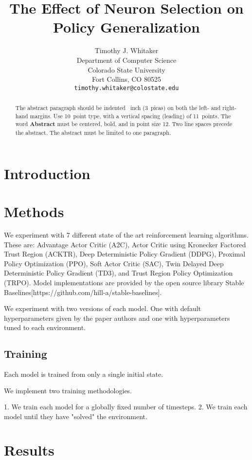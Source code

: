 \documentclass{article}
\title{The Effect of Neuron Selection on Policy Generalization}
\author{%
  Timothy J. Whitaker\\
  Department of Computer Science\\
  Colorado State University\\
  Fort Collins, CO 80525 \\
  \texttt{timothy.whitaker@colostate.edu} \\
}
\begin{document}
\maketitle

\begin{abstract}
  The abstract paragraph should be indented ~inch (3~picas) on
  both the left- and right-hand margins. Use 10~point type, with a vertical
  spacing (leading) of 11~points.  The word \textbf{Abstract} must be centered,
  bold, and in point size 12. Two line spaces precede the abstract. The abstract
  must be limited to one paragraph.
\end{abstract}

\section{Introduction}

\section{Methods}

We experiment with 7 different state of the art reinforcement learning algorithms. These are: Advantage Actor Critic (A2C), Actor Critic using Kronecker Factored Trust Region (ACKTR), Deep Deterministic Policy Gradient (DDPG), Proximal Policy Optimization (PPO), Soft Actor Critic (SAC), Twin Delayed Deep Deterministic Policy Gradient (TD3), and Trust Region Policy Optimization (TRPO). Model implementations are provided by the open source library Stable Baselines[https://github.com/hill-a/stable-baselines].

We experiment with two versions of each model. One with default hyperparameters given by the paper authors and one with hyperparameters tuned to each environment.

\subsection{Training}

Each model is trained from only a single initial state.

We implement two training methodologies.

1. We train each model for a globally fixed number of timesteps.
2. We train each model until they have "solved" the environment.


\section{Results}
\end{document}
